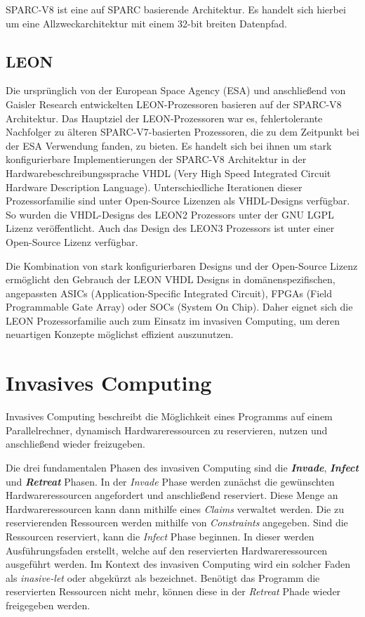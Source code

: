 SPARC-V8 ist eine auf SPARC basierende Architektur. Es handelt sich hierbei um eine Allzweckarchitektur mit einem
32-bit breiten Datenpfad.\cite{sparcv8Eval}

\subsection{LEON}

Die ursprünglich von der European Space Agency (ESA) und anschließend von Gaisler Research entwickelten
LEON-Prozessoren basieren auf der SPARC-V8 Architektur.
Das Hauptziel der LEON-Prozessoren war es, fehlertolerante Nachfolger zu älteren SPARC-V7-basierten
Prozessoren, die zu dem Zeitpunkt bei der ESA Verwendung fanden, zu bieten.\cite{gaislerLeon}
Es handelt sich bei ihnen um stark konfigurierbare
Implementierungen der SPARC-V8 Architektur in der Hardwarebeschreibungssprache
VHDL (Very High Speed Integrated Circuit Hardware Description Language).
Unterschiedliche Iterationen dieser Prozessorfamilie sind unter Open-Source Lizenzen als VHDL-Designs verfügbar.
So wurden die VHDL-Designs des LEON2 Prozessors unter der GNU LGPL Lizenz veröffentlicht.\cite{sparcv8Eval}
Auch das Design des LEON3 Prozessors ist unter einer Open-Source Lizenz verfügbar\cite{}.

Die Kombination von stark konfigurierbaren Designs und der Open-Source Lizenz ermöglicht den Gebrauch der
LEON VHDL Designs in domänenspezifischen, angepassten ASICs (Application-Specific Integrated Circuit),
FPGAs (Field Programmable Gate Array) oder SOCs (System On Chip). Daher eignet sich die LEON Prozessorfamilie
auch zum Einsatz im invasiven Computing, um deren neuartigen Konzepte möglichst effizient auszunutzen.
\cite{sparcv8Eval}

\section{Invasives Computing}

Invasives Computing beschreibt die Möglichkeit eines Programms auf einem Parallelrechner,
dynamisch Hardwareressourcen zu reservieren, nutzen und anschließend wieder freizugeben.\cite{octopos}

Die drei fundamentalen Phasen des invasiven Computing sind die \textit{\textbf{Invade}}, \textit{\textbf{Infect}}
und \textit{\textbf{Retreat}} Phasen. In der \textit{Invade} Phase werden zunächst die gewünschten
Hardwareressourcen angefordert und anschließend reserviert. Diese Menge an Hardwareressourcen kann dann mithilfe
eines \textit{Claims} verwaltet werden. Die zu reservierenden Ressourcen werden mithilfe von \textit{Constraints}
angegeben.
Sind die Ressourcen reserviert, kann die \textit{Infect}
Phase beginnen. In dieser werden Ausführungsfaden erstellt,
welche auf den reservierten Hardwareressourcen ausgeführt werden. Im Kontext des invasiven Computing wird ein solcher
Faden als \textit{inasive-let} oder abgekürzt als  bezeichnet\cite{invasiveCommonTerms}.
Benötigt das Programm die reservierten Ressourcen nicht mehr, können diese in der \textit{Retreat} Phade wieder
freigegeben werden.\cite{octopos}

